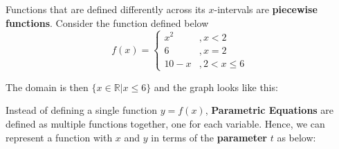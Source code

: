 \documentclass{article}
\begin{document}
    Functions that are defined differently across its $x$-intervals are
    \textbf{piecewise functions}. Consider the function defined below \\

    \begin{equation*}
        f(x)=
        \begin{cases}
            x^2 & ,x<2 \\
            6 & ,x=2 \\
            10-x & , 2<x\leq 6
        \end{cases}
    \end{equation*}

    \noindent The domain is then $\{x\in\mathbb{R}|x\leq 6\}$ and the graph looks like this: \\

    \begin{center}
    \end{center}

    \noindent Instead of defining a single function $y=f(x)$, \textbf{Parametric Equations} are
    defined as multiple functions together, one for each variable. Hence, we can represent a
    function with $x$ and $y$ in terms of the \textbf{parameter} $t$ as below:
\end{document}
